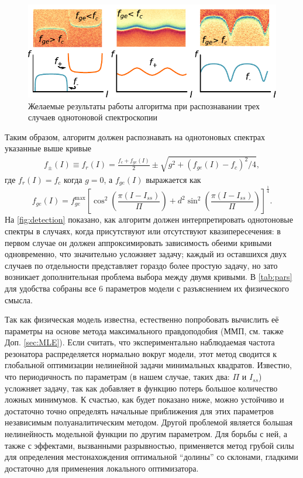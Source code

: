 \documentclass[14pt, a4paper]{extreport}
\numberwithin{equation}{section}
\begin{document}
\begin{figure}
	\centering
	\includegraphics[width=.8\linewidth]{Pictures/detection}
	\caption{Желаемые результаты работы алгоритма при распознавании трех случаев однотоновой спектроскопии}
	\label{fig:detection}
\end{figure}

Таким образом, алгоритм должен распознавать на однотоновых спектрах указанные выше кривые \cite{filipp2011multimode}
\begin{align}
f_\pm(I) \equiv f_r(I) = \frac{f_c + f_{ge}(I)}{2} \pm \sqrt{g^2+(f_{ge}(I) - f_c)^2/4},\label{eq:f_r}
\end{align}
где $f_r(I) = f_c$ когда $g=0$, а $f_{ge}(I)$ выражается как
\begin{equation}
f_{ge}(I) = f_{ge}^\text{max} \left[\cos^2\left(\frac{\pi(I-I_{ss})}{\Pi}\right)+d^2 \sin^2 \left(\frac{\pi(I-I_{ss})}{\Pi}\right)\right]^\frac{1}{4}.
\label{eq:tr_spectrum}
\end{equation}
На \autoref{fig:detection} показано, как алгоритм должен интерпретировать однотоновые спектры в случаях, когда присутствуют или отсутствуют квазипересечения: в первом случае он должен аппроксимировать зависимость обеими кривыми одновременно, что значительно усложняет задачу; каждый из оставшихся двух случаев по отдельности представляет гораздо более простую задачу, но зато возникает дополнительная проблема выбора между двумя кривыми. В \autoref{tab:pars} для удобства собраны все 6 параметров модели с разъяснением их физического смысла.

Так как физическая модель известна, естественно попробовать вычислить её параметры на основе метода максимального правдоподобия (ММП, см. также Доп. \ref{sec:MLE}). Если считать, что экспериментально наблюдаемая частота резонатора распределяется нормально вокруг модели, этот метод сводится к глобальной оптимизации нелинейной задачи минимальных квадратов. Известно, что периодичность по параметрам (в нашем случае, таких два: $\Pi$ и $I_{ss}$) усложняет задачу, так как добавляет в функцию потерь большое количество ложных минимумов. К счастью, как будет показано ниже, можно устойчиво и достаточно точно определять начальные приближения для этих параметров независимым полуаналитическим методом. Другой проблемой является большая нелинейность модельной функции по другим параметром. Для борьбы с ней, а также с эффектами, вызванными разрывностью, применяется метод грубой силы для определения местонахождения оптимальной ``долины'' со склонами, гладкими достаточно для применения локального оптимизатора. 
\end{document}
